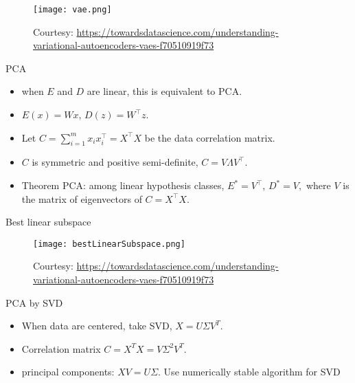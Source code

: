 \documentclass[final]{beamer}
\begin{document}
\begin{frame}
\begin{figure}
	\texttt{[image: vae.png]}
	\caption{Courtesy: \url{https://towardsdatascience.com/understanding-variational-autoencoders-vaes-f70510919f73}}
\end{figure}
\end{frame}
\begin{frame}{PCA}
	\begin{itemize}
	\item when $E$ and $D$ are linear, this is equivalent to PCA.
	\pause 
	\item $E(x) = Wx$, $D(z) = W^\top z$.
	\pause
	\item Let $C = \sum_{i=1}^m x_i x_i^\top = X^\top X$ be the data correlation matrix.
	\pause 
	\item $C$ is symmetric and positive semi-definite, $C = V \Lambda V^\top$.
	\item Theorem PCA: among linear hypothesis classes, $E^* = V^\top$, $D^* = V,$ where $V$ is the matrix of eigenvectors of $C = X^\top X$.
	\end{itemize}
\end{frame}
\begin{frame}{Best linear subspace}
	\begin{figure}
	\texttt{[image: bestLinearSubspace.png]}
	\caption{Courtesy: \url{https://towardsdatascience.com/understanding-variational-autoencoders-vaes-f70510919f73}}

	\end{figure}
\end{frame}
\begin{frame}{PCA by SVD}
	\begin{itemize}
		\item When data are centered, take SVD, $X = U \Sigma V^T$.
		\pause
		\item Correlation matrix $C =  X^T X = V \Sigma^2 V^T$.
		\pause
		\item principal components: $X V = U \Sigma$.
		\pause
		Use numerically stable algorithm for SVD
	\end{itemize}
\end{frame}
\end{document}
